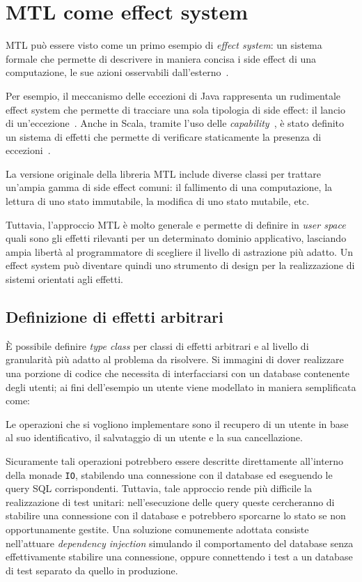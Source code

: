 \section{MTL come effect system}

MTL può essere visto come un primo esempio di \emph{effect system}: un sistema formale che permette di descrivere in maniera concisa i side effect di una computazione, le sue azioni osservabili dall'esterno~\cite[p.~943]{cit:design-concepts-in-programming-languages}.

Per esempio, il meccanismo delle eccezioni di Java rappresenta un rudimentale effect system che permette di tracciare una sola tipologia di side effect: il lancio di un'eccezione~\cite[p.~985]{cit:design-concepts-in-programming-languages}.
Anche in Scala, tramite l'uso delle \emph{capability}~\cite{cit:scala-3-reference-canthrow}, è stato definito un sistema di effetti che permette di verificare staticamente la presenza di eccezioni~\cite{cit:safer-exceptions-for-scala}.

La versione originale della libreria MTL include diverse classi per trattare un'ampia gamma di side effect comuni: il fallimento di una computazione, la lettura di uno stato immutabile, la modifica di uno stato mutabile, etc.

Tuttavia, l'approccio MTL è molto generale e permette di definire in \emph{user space} quali sono gli effetti rilevanti per un determinato dominio applicativo, lasciando ampia libertà al programmatore di scegliere il livello di astrazione più adatto.
Un effect system può diventare quindi uno strumento di design per la realizzazione di sistemi orientati agli effetti.

\subsection{Definizione di effetti arbitrari}
È possibile definire \emph{type class} per classi di effetti arbitrari e al livello di granularità più adatto al problema da risolvere. Si immagini di dover realizzare una porzione di codice che necessita di interfacciarsi con un database contenente degli utenti; ai fini dell'esempio un utente viene modellato in maniera semplificata come:

Le operazioni che si vogliono implementare sono il recupero di un utente in base al suo identificativo, il salvataggio di un utente e la sua cancellazione.

Sicuramente tali operazioni potrebbero essere descritte direttamente all'interno della monade \lstinline{IO}, stabilendo una connessione con il database ed eseguendo le query SQL corrispondenti. Tuttavia, tale approccio rende più difficile la realizzazione di test unitari: nell'esecuzione delle query queste cercheranno di stabilire una connessione con il database e potrebbero sporcarne lo stato se non opportunamente gestite. Una soluzione comunemente adottata consiste nell'attuare \emph{dependency injection} simulando il comportamento del database senza effettivamente stabilire una connessione, oppure connettendo i test a un database di test separato da quello in produzione.

